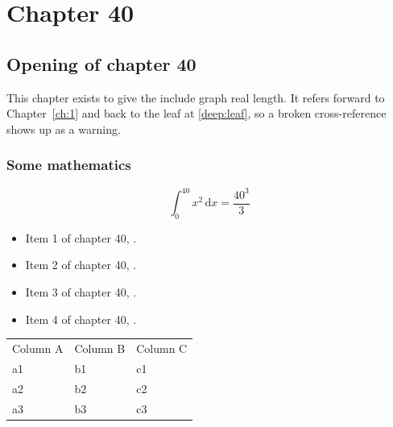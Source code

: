 \chapter{Chapter 40}
\label{ch:40}
\section{Opening of chapter 40}
This chapter exists to give the include graph real length. It refers
forward to Chapter~\ref{ch:1} and back to the leaf
at \ref{deep:leaf}, so a broken cross-reference shows up as a warning.

\subsection{Some mathematics}
\begin{equation}
  \int_0^{40} x^{2} \, \mathrm{d}x = \frac{40^{3}}{3}
\end{equation}

\begin{itemize}
  \item Item 1 of chapter 40, .
  \item Item 2 of chapter 40, .
  \item Item 3 of chapter 40, .
  \item Item 4 of chapter 40, .
\end{itemize}

\begin{tabular}{lll}
  Column A & Column B & Column C \\
  a1 & b1 & c1 \\
  a2 & b2 & c2 \\
  a3 & b3 & c3 \\
\end{tabular}

